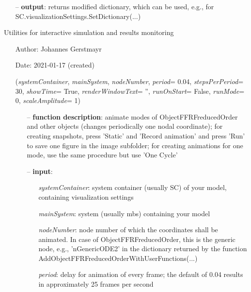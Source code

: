 \begin{itemize}[leftmargin=1.4cm]
\begin{itemize}[leftmargin=0.5cm]
\begin{itemize}[leftmargin=1.4cm]
\begin{itemize}[leftmargin=1.4cm]
\begin{itemize}[leftmargin=0.5cm]
\begin{itemize}[leftmargin=1.4cm]
\begin{itemize}[leftmargin=0.5cm]
\begin{itemize}[leftmargin=1.4cm]
\begin{itemize}[leftmargin=0.7cm]
\begin{itemize}[leftmargin=1.2cm]
  \end{itemize}
  \item[--]  {\bf output}: returns modified dictionary, which can be used, e.g., for SC.visualizationSettings.SetDictionary(...)\vspace{12pt}\end{itemize}
%
\label{sec:module:interactive}
  Utilities for interactive simulation and results monitoring
\begin{itemize}[leftmargin=1.4cm]
\setlength{\itemindent}{-1.4cm}
\item[]Author:    Johannes Gerstmayr
\item[]Date:      2021-01-17 (created)
\ei
\begin{flushleft}
\label{sec:interactive:AnimateModes}
({\it systemContainer}, {\it mainSystem}, {\it nodeNumber}, {\it period}= 0.04, {\it stepsPerPeriod}= 30, {\it showTime}= True, {\it renderWindowText}= '', {\it runOnStart}= False, {\it runMode}= 0, {\it scaleAmplitude}= 1)
\end{flushleft}
\setlength{\itemindent}{0.7cm}
\begin{itemize}[leftmargin=0.7cm]
  \item[--]  {\bf function description}: animate modes of ObjectFFRFreducedOrder and other objects (changes periodically one nodal coordinate); for creating snapshots, press 'Static' and 'Record animation' and press 'Run' to save one figure in the image subfolder; for creating animations for one mode, use the same procedure but use 'One Cycle'  \item[--]  {\bf input}: \vspace{-6pt}
  \begin{itemize}[leftmargin=1.2cm]
\setlength{\itemindent}{-0.7cm}
    \item[] {\it systemContainer}: system container (usually SC) of your model, containing visualization settings
    \item[] {\it     mainSystem}: system (usually mbs) containing your model
    \item[] {\it     nodeNumber}: node number of which the coordinates shall be animated. In case of ObjectFFRFreducedOrder, this is the generic node, e.g., 'nGenericODE2' in the dictionary returned by the function AddObjectFFRFreducedOrderWithUserFunctions(...)
    \item[] {\it     period}: delay for animation of every frame; the default of 0.04 results in approximately 25 frames per second

\end{itemize}
\end{itemize}
\end{itemize}
\end{itemize}
\end{itemize}
\end{itemize}
\end{itemize}
\end{itemize}
\end{itemize}
\end{itemize}
\end{itemize}
